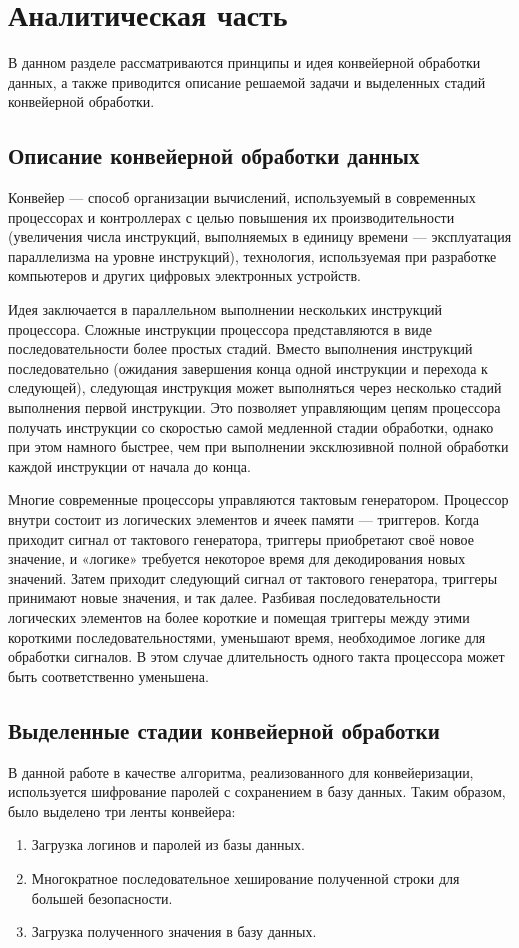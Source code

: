 \documentclass[12pt]{report}
\begin{document}
    \chapter{Аналитическая часть}	
    В данном разделе рассматриваются принципы и идея конвейерной обработки данных, а также приводится описание решаемой задачи и выделенных стадий конвейерной обработки.
    
    \section{Описание конвейерной обработки данных}
    Конвейер\cite{conveyor} — способ организации вычислений, используемый в современных процессорах и контроллерах с целью повышения их производительности (увеличения числа инструкций, выполняемых в единицу времени — эксплуатация параллелизма на уровне инструкций), технология, используемая при разработке компьютеров и других цифровых электронных устройств.
    
    Идея заключается в параллельном выполнении нескольких инструкций процессора. Сложные инструкции процессора представляются в виде последовательности более простых стадий. Вместо выполнения инструкций последовательно (ожидания завершения конца одной инструкции и перехода к следующей), следующая инструкция может выполняться через несколько стадий выполнения первой инструкции. Это позволяет управляющим цепям процессора получать инструкции со скоростью самой медленной стадии обработки, однако при этом намного быстрее, чем при выполнении эксклюзивной полной обработки каждой инструкции от начала до конца.
    
    Многие современные процессоры управляются тактовым генератором. Процессор внутри состоит из логических элементов и ячеек памяти — триггеров. Когда приходит сигнал от тактового генератора, триггеры приобретают своё новое значение, и «логике» требуется некоторое время для декодирования новых значений. Затем приходит следующий сигнал от тактового генератора, триггеры принимают новые значения, и так далее. Разбивая последовательности логических элементов на более короткие и помещая триггеры между этими короткими последовательностями, уменьшают время, необходимое логике для обработки сигналов. В этом случае длительность одного такта процессора может быть соответственно уменьшена.
    
    \section{Выделенные стадии конвейерной обработки}
    В данной работе в качестве алгоритма, реализованного для конвейеризации, используется шифрование паролей с сохранением в базу данных. Таким образом, было выделено три ленты конвейера:
    \begin{enumerate}
    	\item Загрузка логинов и паролей из базы данных.
    	\item Многократное последовательное хеширование полученной строки для большей безопасности.
    	\item Загрузка полученного значения в базу данных.
    \end{enumerate}
\end{document}
